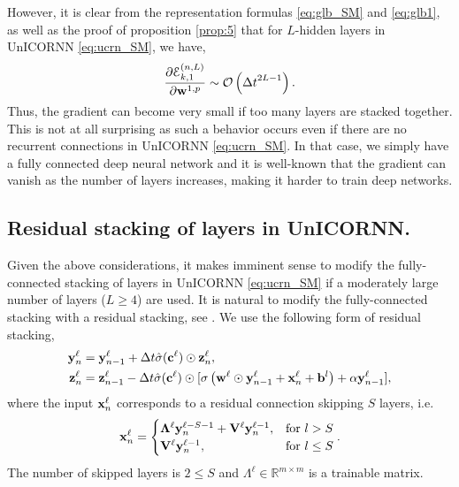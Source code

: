 \documentclass{article}
\newcommand{\by}{{\bf y}}
\newcommand{\bz}{{\bf z}}
\newcommand{\bw}{{\bf w}}
\newcommand{\bb}{{\bf b}}
\newcommand{\bV}{{\bf V}}
\newcommand{\bc}{{\bf c}}
\newcommand{\ord}{{\mathcal O}}
\newcommand{\R}{{\mathbb R}}
\newcommand{\Dt}{{\Delta t}}
\newcommand{\E}{\EuScript{E}}
\newcommand{\bx}{{\bf x}}
\begin{document}
However, it is clear from the representation formulas \eqref{eq:glb_SM} and \eqref{eq:glb1}, as well as the proof of proposition \ref{prop:5} that for $L$-hidden layers in UnICORNN \eqref{eq:ucrn_SM}, we have,
\begin{equation}
\label{eq:scl}
\frac{\partial \E^{(n,L)}_{k,1}}{\partial \bw^{1,p}} \sim \ord\left(\Dt^{2L-1}\right).
\end{equation}
Thus, the gradient can become very small if too many layers are stacked together. This is not at all surprising as such a behavior occurs even if there are no recurrent connections in UnICORNN \eqref{eq:ucrn_SM}. In that case, we simply have a fully connected deep neural network and it is well-known that the gradient can vanish as the number of layers increases, making it harder to train deep networks. 
\subsection{Residual stacking of layers in UnICORNN.}
\label{resnet_grad}
Given the above considerations, it makes imminent sense to modify the fully-connected stacking of layers in UnICORNN \eqref{eq:ucrn_SM} if a moderately large number of layers ($L \geq 4$) are used. It is natural to modify the fully-connected stacking with a residual stacking, see \cite{deep_indrnn}. We use the following form of residual stacking,
\begin{align} 
\label{eq:ucrn_res}
\by_n^{\ell} &= \by_{n-1}^{\ell} + \Dt\hat{\sigma}(\bc^{\ell})\odot \bz_n^{\ell}, \\
\bz_n^{\ell} &= \bz_{n-1}^{\ell} - \Dt\hat{\sigma}(\bc^\ell)\odot[\sigma\left(\bw^\ell \odot \by_{n-1}^\ell + \bx_n^{\ell} + \bb^l \right) +\alpha \by_{n-1}^{\ell}],
\end{align}
where the input $\bx_n^{\ell}$ corresponds to a residual connection skipping $S$ layers, i.e.
\begin{align*}
    \bx_n^{\ell} = \begin{cases} {\bf \Lambda}^{\ell} \by_n^{\ell-S-1} + \bV^\ell \by_n^{\ell-1}, & \text{for } l>S \\ \bV^\ell \by_n^{\ell-1}, & \text{for } l\leq S
    \end{cases}.
\end{align*}
The number of skipped layers is $2 \leq S$ and $\Lambda^{\ell} \in \R^{m \times m}$ is a trainable matrix. 
\end{document}
